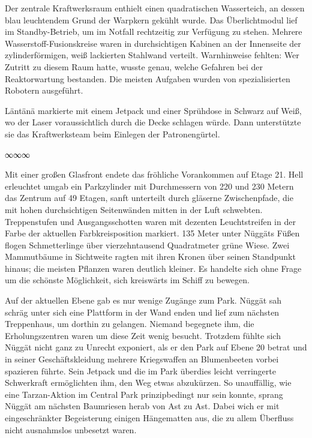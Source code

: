 Der zentrale Kraftwerksraum enthielt einen quadratischen Wasserteich, an dessen blau leuchtendem Grund der Warpkern gekühlt wurde. Das Überlichtmodul lief im Standby-Betrieb, um im Notfall rechtzeitig zur Verfügung zu stehen. Mehrere Wasserstoff-Fusionskreise waren in durchsichtigen Kabinen an der Innenseite der zylinderförmigen, weiß lackierten Stahlwand verteilt. Warnhinweise fehlten: Wer Zutritt zu diesem Raum hatte, wusste genau, welche Gefahren bei der Reaktorwartung bestanden. Die meisten Aufgaben wurden von spezialisierten Robotern ausgeführt.

Läntänä markierte mit einem Jetpack und einer Sprühdose in Schwarz auf Weiß, wo der Laser voraussichtlich durch die Decke schlagen würde. Dann unterstützte sie das Kraftwerksteam beim Einlegen der Patronengürtel.

\begin{center}
∞∞∞
\end{center}

Mit einer großen Glasfront endete das fröhliche Vorankommen auf Etage 21. Hell erleuchtet umgab ein Parkzylinder mit Durchmessern von 220 und 230 Metern das Zentrum auf 49 Etagen, sanft unterteilt durch gläserne Zwischenpfade, die mit hohen durchsichtigen Seitenwänden mitten in der Luft schwebten. Treppenstufen und Ausgangsschotten waren mit dezenten Leuchtstreifen in der Farbe der aktuellen Farbkreisposition markiert. 135 Meter unter Nüggäts Füßen flogen Schmetterlinge über vierzehntausend Quadratmeter grüne Wiese. Zwei Mammutbäume in Sichtweite ragten mit ihren Kronen über seinen Standpunkt hinaus; die meisten Pflanzen waren deutlich kleiner. Es handelte sich ohne Frage um die schönste Möglichkeit, sich kreiswärts im Schiff zu bewegen.

Auf der aktuellen Ebene gab es nur wenige Zugänge zum Park. Nüggät sah schräg unter sich eine Plattform in der Wand enden und lief zum nächsten Treppenhaus, um dorthin zu gelangen. Niemand begegnete ihm, die Erholungszentren waren um diese Zeit wenig besucht. Trotzdem fühlte sich Nüggät nicht ganz zu Unrecht exponiert, als er den Park auf Ebene 20 betrat und in seiner Geschäftskleidung mehrere Kriegswaffen an Blumenbeeten vorbei spazieren führte. Sein Jetpack und die im Park überdies leicht verringerte Schwerkraft ermöglichten ihm, den Weg etwas abzukürzen. So unauffällig, wie eine Tarzan-Aktion im Central Park prinzipbedingt nur sein konnte, sprang Nüggät am nächsten Baumriesen herab von Ast zu Ast. Dabei wich er mit eingeschränkter Begeisterung einigen Hängematten aus, die zu allem Überfluss nicht ausnahmslos unbesetzt waren.

